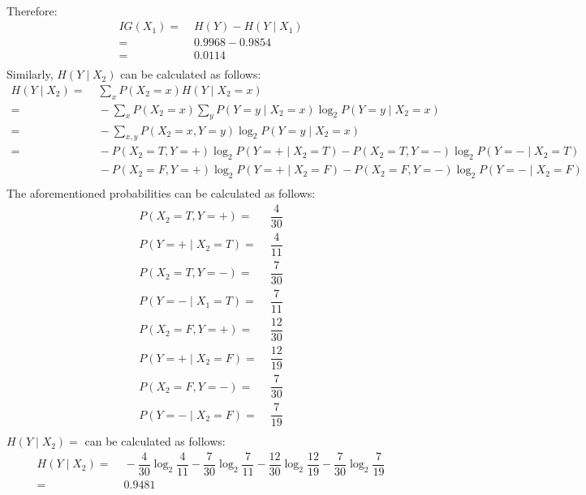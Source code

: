 \documentclass[english]{article}
\begin{document}
\begin{enumerate}
\begin{enumerate}
\begin{align*}
    \end{align*}
  Therefore:
    \begin{align*}
      IG(X_1) =&\; H(Y) - H(Y \mid X_1) \\
      =&\; 0.9968 - 0.9854 \\
      =&\; 0.0114 \\
    \end{align*}
  Similarly, $H(Y \mid X_2)$ can be calculated as follows:
    \begin{align*}
      H(Y \mid X_2) = &\; \sum_{x} P(X_2 = x) H(Y \mid X_2 = x) \\
      =&\; - \sum_{x} P(X_2 = x) \sum_{y} P(Y = y \mid X_2 = x) \log_2 P(Y = y \mid X_2 = x) \\
      =&\; - \sum_{x, y} P(X_2 = x, Y = y) \log_2 P(Y = y \mid X_2 = x) \\
      =&\; - P(X_2 = T, Y = +) \log_2 P(Y = + \mid X_2 = T) - P(X_2 = T, Y = -) \log_2 P(Y = - \mid X_2 = T) \\
      &\; - P(X_2 = F, Y = +) \log_2 P(Y = + \mid X_2 = F) - P(X_2 = F, Y = -) \log_2 P(Y = - \mid X_2 = F) \\
    \end{align*}
  The aforementioned probabilities can be calculated as follows: \\
    \begin{align*}
      P(X_2 = T, Y = +) =&\; \dfrac{4}{30} \\
      P(Y = + \mid X_2 = T) =&\; \dfrac{4}{11} \\
      P(X_2 = T, Y = -) =&\; \dfrac{7}{30} \\
      P(Y = - \mid X_1 = T) =&\; \dfrac{7}{11} \\
      P(X_2 = F, Y = +) =&\; \dfrac{12}{30} \\
      P(Y = + \mid X_2 = F) =&\; \dfrac{12}{19} \\
      P(X_2 = F, Y = -) =&\; \dfrac{7}{30} \\
      P(Y = - \mid X_2 = F) =&\; \dfrac{7}{19} \\
    \end{align*}
  $H(Y \mid X_2)=$ can be calculated as follows: \\
    \begin{align*}
      H(Y \mid X_2) = &\; - \dfrac{4}{30} \log_2 \dfrac{4}{11} - \dfrac{7}{30} \log_2 \dfrac{7}{11} - \dfrac{12}{30} \log_2 \dfrac{12}{19} - \dfrac{7}{30} \log_2 \dfrac{7}{19}\\
      = &\; 0.9481 \\
    \end{align*}

\end{enumerate}
\end{enumerate}
\end{document}
